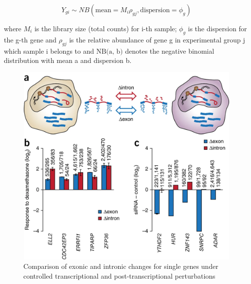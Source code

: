 \begin{equation}
Y_{gi} \sim NB(\text{mean} = M_{i}\rho_{gj}, \text{dispersion} = \phi_g)
\label{eqn:edger}
\end{equation}

where $M_i$ is the library size (total counts) for i-th sample; $\phi_g$ is the dispersion for the g-th gene and $\rho_{gj}$ is the relative abundance of gene g in experimental group j which sample i belongs to and $\text{NB(a, b)}$ denotes the negative binomial distribution with mean a and dispersion b.

\begin{figure}[!htb]
\begin{center}
\includegraphics[width=6in,height=4in]{../figures/eisar.png}
\end{center}
\caption{Comparison of exonic and intronic changes for single genes under controlled transcriptional and post-transcriptional perturbations \citep{eisar}}
\label{fig:eisar}
\end{figure}
\FloatBarrier

